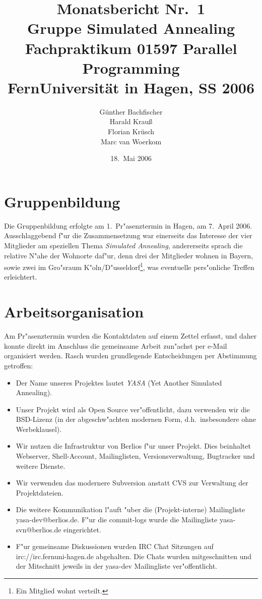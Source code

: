 \documentclass[12pt,a4paper]{article}
\author{G\"unther Bachfischer \\
        Harald Krau\ss{} \\
	Florian Kr\"usch \\
	Marc van Woerkom}
\title{\textbf{Monatsbericht Nr.\ 1}\\
       {\normalsize Gruppe Simulated Annealing} \\
       {\small Fachpraktikum 01597 Parallel Programming} \\
       {\small FernUniversit\"at in Hagen, SS 2006}}
\date{18.\ Mai 2006}
\begin{document}
\maketitle

\section{Gruppenbildung}
Die Gruppenbildung erfolgte am 1.\ Pr"asenztermin in Hagen, am 7.\ April 2006.
Ausschlaggebend f"ur die Zusammensetzung war einerseits das Interesse der vier 
Mitglieder am speziellen Thema {\em Simulated Annealing}, andererseits sprach
die relative N"ahe der Wohnorte daf"ur, denn drei der Mitglieder wohnen in 
Bayern, sowie zwei im Gro"sraum 
K"oln/D"usseldorf\footnote{Ein Mitglied wohnt verteilt.},
was eventuelle pers"onliche Treffen erleichtert.
  
\section{Arbeitsorganisation}
Am Pr"asenztermin wurden die Kontaktdaten auf einem Zettel erfasst, und 
daher konnte direkt im Anschluss die gemeinsame Arbeit zun"achst per
e-Mail organisiert werden.
\noindent
Rasch wurden grundlegende Entscheidungen per Abstimmung getroffen:
\begin{itemize}
\item Der Name unseres Projektes lautet {\em YASA} (Yet Another Simulated
      Annealing).
\item Unser Projekt wird als Open Source ver"offentlicht, dazu verwenden 
      wir die BSD-Lizenz (in der abgeschw"achten modernen Form, 
      d.h.\ insbesondere ohne Werbeklausel).
\item Wir nutzen die Infrastruktur von Berlios f"ur unser Projekt.
      Dies beinhaltet Webserver, Shell-Account, Mailinglisten, 
      Versionsverwaltung, Bugtracker und weitere Dienste.
\item Wir verwenden das modernere Subversion anstatt CVS zur Verwaltung 
      der Projektdateien.
\item Die weitere Kommunikation l"auft "uber die (Projekt-interne) 
      Mailingliste yasa-dev@berlios.de. 
      F"ur die commit-logs wurde die Mailingliste 
      yasa-svn@berlios.de eingerichtet.
\item F"ur gemeinsame Diskussionen wurden IRC Chat Sitzungen 
      auf irc://irc.fernuni-hagen.de abgehalten.
      Die Chats wurden mitgeschnitten und der Mitschnitt jeweils
      in der yasa-dev Mailingliste ver"offentlicht.
\end{itemize}
\end{document}

